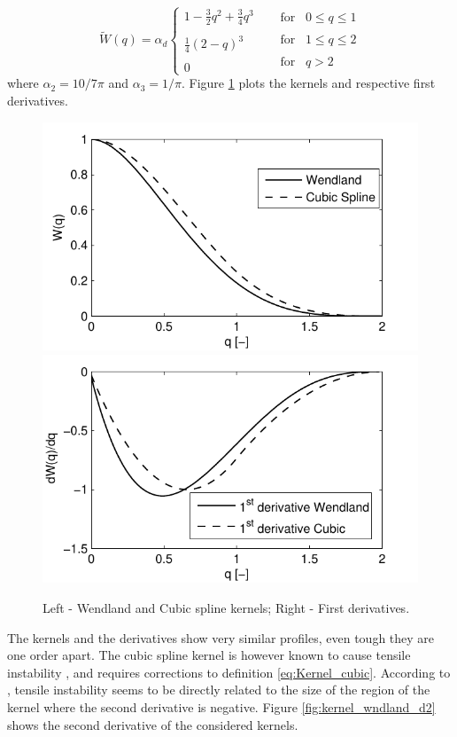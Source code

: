 % 
\begin{equation} \label{eq:Kernel_cubic}
	\tilde{W}(q)=\alpha_d\left\{ {\begin{array}{*{20}{c}}
  {1-\frac{3}{2}q^2+\frac{3}{4}q^3} \\\\
  {\frac{1}{4}(2-q)^3} \\\\
  0 
\end{array}} \right.
\;\;\;\;\
\begin{array}{*{20}{c}}
  \text{for}\;\;\;{0 \leq q \leq 1} \\\\
  \text{for}\;\;\;{1 \leq q \leq 2} \\\\
  \text{for}\;\;\;{q > 2} 
\end{array}
\end{equation}
%
where $\alpha_2=10/7\pi$ and $\alpha_3=1/\pi$. Figure \ref{fig:kernel_wendland} plots the kernels and respective first derivatives.

%
\begin{figure}[ht!]
	\centering 
	\includegraphics[width=0.49\linewidth]{Figures/3.Chapter/Kernels}
	\includegraphics[width=0.49\linewidth]{Figures/3.Chapter/Kernels_deriv}
	\caption{Left - Wendland and Cubic spline kernels; Right - First derivatives.}
	\label{fig:kernel_wendland} 
\end{figure}
%
The kernels and the derivatives show very similar profiles, even tough they are one order apart. The cubic spline kernel is however known to cause tensile instability \cite{Monaghan-1999}, and requires corrections to definition \eqref{eq:Kernel_cubic}. According to \cite{Swegle-1995}, tensile instability seems to be directly related to the size of the region of the kernel where the second derivative is negative. Figure \ref{fig:kernel_wndland_d2} shows the second derivative of the considered kernels.

